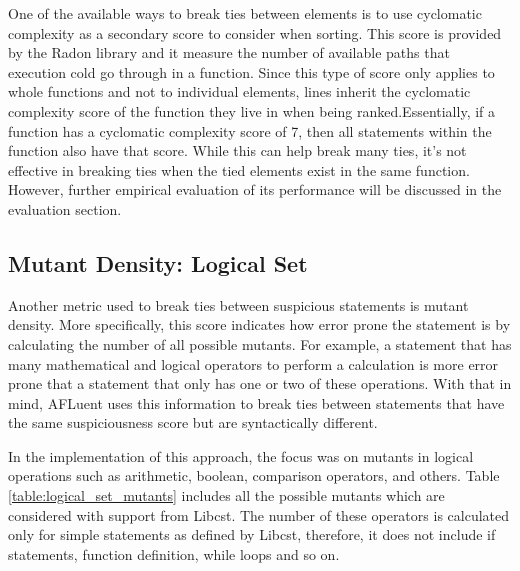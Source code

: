 One of the available ways to break ties between elements is to use cyclomatic
complexity as a secondary score to consider when sorting. This score is provided
by the Radon library and it measure the number of available paths that execution
cold go through in a function. Since this type of score only applies to whole
functions and not to individual elements, lines inherit the cyclomatic
complexity score of the function they live in when being ranked.Essentially, if
a function has a cyclomatic complexity score of 7, then all statements within
the function also have that score. While this can help break many ties, it's not
effective in breaking ties when the tied elements exist in the same function.
However, further empirical evaluation of its performance will be discussed in
the evaluation section.

\subsection{Mutant Density: Logical Set}
\label{subsec:tiebreak_mutant_density_logical}

Another metric used to break ties between suspicious statements is mutant
density. More specifically, this score indicates how error prone the statement
is by calculating the number of all possible mutants. For example, a statement
that has many mathematical and logical operators to perform a calculation is
more error prone that a statement that only has one or two of these operations.
With that in mind, AFLuent uses this information to break ties between
statements that have the same suspiciousness score but are syntactically
different.

In the implementation of this approach, the focus was on mutants in logical
operations such as arithmetic, boolean, comparison operators, and others.
Table \ref{table:logical_set_mutants} includes all the possible mutants which
are considered with support from Libcst. The number of these operators is
calculated only for simple statements as defined by Libcst, therefore, it does
not include if statements, function definition, while loops and so on.

